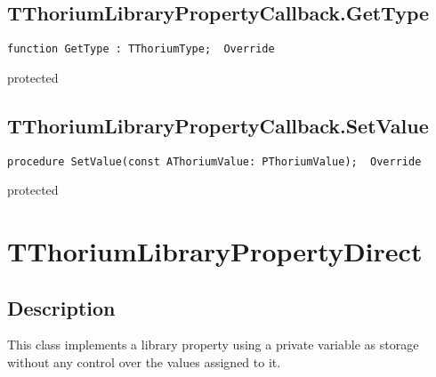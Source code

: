 \subsection{TThoriumLibraryPropertyCallback.GetType}
\label{thoriumcorepkg:thorium:tthoriumlibrarypropertycallback:gettype}
\begin{FPCList}
\Declaration 

\begin{verbatim}
function GetType : TThoriumType;  Override
\end{verbatim}
\Visibility
protected
\end{FPCList}
\subsection{TThoriumLibraryPropertyCallback.SetValue}
\label{thoriumcorepkg:thorium:tthoriumlibrarypropertycallback:setvalue}
\begin{FPCList}
\Declaration 

\begin{verbatim}
procedure SetValue(const AThoriumValue: PThoriumValue);  Override
\end{verbatim}
\Visibility
protected
\end{FPCList}
\section{TThoriumLibraryPropertyDirect}
\label{thoriumcorepkg:thorium:tthoriumlibrarypropertydirect}
\subsection{Description}
This class implements a library property using a private variable as storage without any control over the values assigned to it.%
